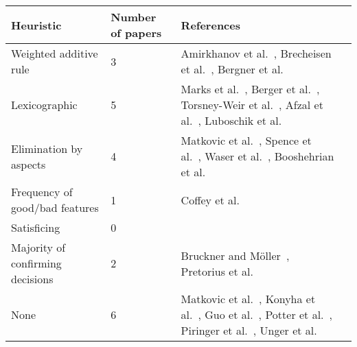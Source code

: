 
\begin{supertabular}[c]{@{}llll@{}}
\toprule
Heuristic & Number of papers & References\tabularnewline
\midrule
Weighted additive rule & 3 & Amirkhanov et al.~\citep{Amirkhanov:2010},
                             Brecheisen et al.~\citep{Brecheisen:2009},
                             Bergner et al.~\citep{Bergner:2013}\tabularnewline
Lexicographic & 5 & Marks et al.~\citep{Marks:1997},
                    Berger et al.~\citep{Berger:2011},
                    Torsney-Weir et al.~\citep{Torsney-Weir:2011},
                    Afzal et al.~\citep{Afzal:2011},
                    Luboschik et al.~\citep{Luboschik:2014}\tabularnewline
Elimination by aspects & 4 & Matkovic et al.~\citep{Matkovic:2009},
                             Spence et al.~\citep{Spence:1995},
                             Waser et al.~\citep{Waser:2010},
                             Booshehrian et al.~\citep{Booshehrian:2012}\tabularnewline
Frequency of good/bad features & 1 & Coffey et al.~\citep{Coffey:2013}\tabularnewline
Satisficing & 0 & \tabularnewline
Majority of confirming decisions & 2 & Bruckner and M{\"o}ller~\citep{Bruckner:2010},
                                       Pretorius et al.~\citep{Pretorius:2011}\tabularnewline
None & 6 & Matkovic et al.~\citep{Matkovic:2008},
           Konyha et al.~\citep{Konyha:2006},
           Guo et al.~\citep{Guo:2009},
           Potter et al.~\citep{Potter:2009},
           Piringer et al.~\citep{Piringer:2010},
           Unger et al.~\citep{Unger:2012}\tabularnewline
\bottomrule
\end{supertabular}

